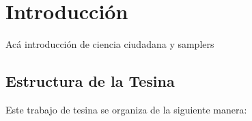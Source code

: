 \chapter{Introducción}

\label{introduccion}


Acá introducción de ciencia ciudadana y samplers \cite{wtf}

\section{ Estructura de la Tesina }
Este trabajo de tesina se organiza de la siguiente manera:
